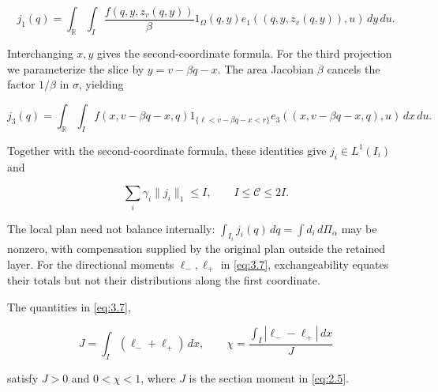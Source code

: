 \begin{equation}
j_1(q)=\int_{\mathbb R}\int_I
\frac{f(q,y,z_v(q,y))}{\beta}1_\Omega(q,y)
e_1((q,y,z_v(q,y)),u)\,dy\,du.
\tag{A.4}\label{eq:A.4}
\end{equation}

Interchanging \(x,y\) gives the second-coordinate formula. For the third projection we parameterize the slice by \(y=v-\beta q-x\). The area Jacobian \(\beta\) cancels the factor \(1/\beta\) in \(\sigma\), yielding

\begin{equation}
j_3(q)=\int_{\mathbb R}\int_I
f(x,v-\beta q-x,q)1_{\{\ell<v-\beta q-x<r\}}
e_3((x,v-\beta q-x,q),u)\,dx\,du.
\tag{A.5}\label{eq:A.5}
\end{equation}

Together with the second-coordinate formula, these identities give \(j_i\in L^1(I_i)\) and

\begin{equation}
\sum_i\gamma_i\|j_i\|_1\le I,\qquad I\le\mathcal C\le2I.
\tag{A.6}\label{eq:A.6}
\end{equation}

The local plan need not balance internally: \(\int_{I_i}j_i(q)\,dq=\int d_i\,d\Pi_\alpha\) may be nonzero, with compensation supplied by the original plan outside the retained layer. For the directional moments \(\ell_-,\ell_+\) in \eqref{eq:3.7}, exchangeability equates their totals but not their distributions along the first coordinate.

\begin{lemma}\label{lem:projected-imbalance} The quantities in \eqref{eq:3.7},

\begin{equation}
J=\int_I(\ell_-+\ell_+)\,dx,\qquad
\chi=\frac{\int_I|\ell_--\ell_+|\,dx}{J}
\tag{A.7}\label{eq:A.7}
\end{equation}

satisfy \(J>0\) and \(0<\chi<1\), where \(J\) is the section moment in \eqref{eq:2.5}.
\end{lemma}

